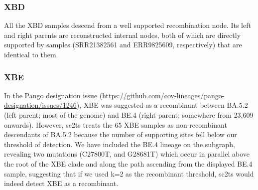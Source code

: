 \documentclass[12pt]{article}
\begin{document}




\subsubsection{XBD}
\label{sec:dd_xbd}

All the XBD samples descend from a well supported recombination node.
Its left and right parents are reconstructed internal nodes,
both of which are directly supported by samples
(SRR21382561 and ERR9825609, respectively)
that are identical to them.

\subsubsection{XBE}
\label{sec:dd_xbe}

In the Pango designation issue
(\url{https://github.com/cov-lineages/pango-designation/issues/1246}),
XBE was suggested as a recombinant between
BA.5.2 (left parent; most of the genome) and
BE.4 (right parent; somewhere from 23,609 onwards).
However, sc2ts treats the 65 XBE samples
as non-recombinant descendants of BA.5.2
because the number of supporting sites
fell below our threshold of detection.
We have included the BE.4 lineage on the subgraph,
revealing two mutations (C27800T, and G28681T)
which occur in parallel above the root of the XBE clade
and along the path ascending from the displayed BE.4 sample,
suggesting that if we used k=2
as the recombinant threshold,
sc2ts would indeed detect XBE as a recombinant.
\end{document}
